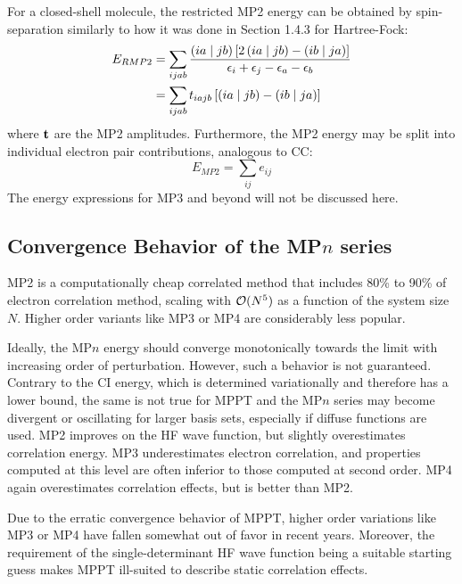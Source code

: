 \noindent For a closed-shell molecule, the restricted MP2 energy can be obtained by spin-separation similarly to how it was done in Section 1.4.3 for Hartree-Fock:
\begin{equation}
\begin{split}
E_{RMP2} &= \sum_{ijab} \frac{\left( ia \mid jb \right)\left[2\left( ia \mid jb \right) - \left( ib \mid ja \right) \right]}{\epsilon_i + \epsilon_j - \epsilon_a - \epsilon_b} \\
&= \sum_{ijab} t_{iajb} \left[\left( ia \mid jb \right) - \left( ib \mid ja \right) \right]
\end{split}
\label{eq:RMP2}
\end{equation}
\noindent where $\mathbf{t}$ are the MP2 amplitudes. Furthermore, the MP2 energy may be split into individual electron pair contributions, analogous to CC:
\begin{equation}
E_{MP2} = \sum_{ij} e_{ij}
\end{equation}
\noindent The energy expressions for MP3 and beyond will not be discussed here.

\subsection{Convergence Behavior of the MP$n$ series}

MP2 is a computationally cheap correlated method that includes 80\% to 90\% of electron correlation method, scaling with $\mathcal{O}(N^{5})$ as a function of the system size $N$. Higher order variants like MP3 or MP4 are considerably less popular. 

Ideally, the MP$n$ energy should converge monotonically towards the limit with increasing order of perturbation. However, such a behavior is not guaranteed. Contrary to the CI energy, which is determined variationally and therefore has a lower bound, the same is not true for MPPT and the MP$n$ series may become divergent or oscillating for larger basis sets, especially if diffuse functions are used. MP2 improves on the HF wave function, but slightly overestimates correlation energy. MP3 underestimates electron correlation, and properties computed at this level are often inferior to those computed at second order. MP4 again overestimates correlation effects, but is better than MP2.

Due to the erratic convergence behavior of MPPT, higher order variations like MP3 or MP4 have fallen somewhat out of favor in recent years. Moreover, the requirement of the single-determinant HF wave function being a suitable starting guess makes MPPT ill-suited to describe static correlation effects.  

